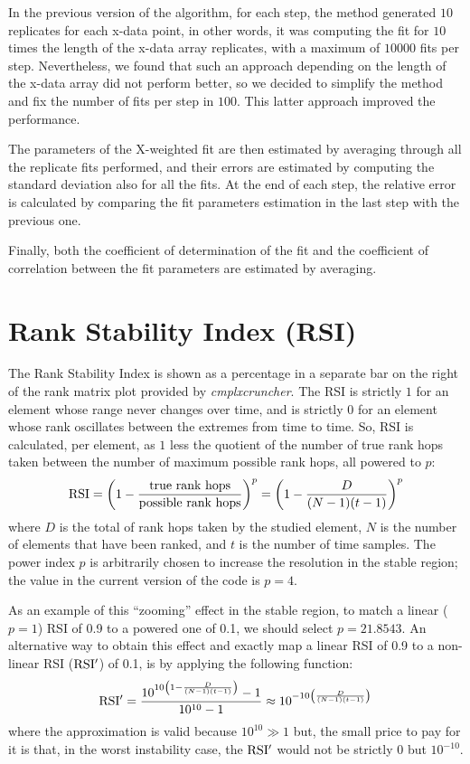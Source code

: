 \documentclass[12pt]{article}
\newcommand{\CC}[0]{\emph{cmplxcruncher}}
\begin{document}
In the previous version of the algorithm, for each step, the method generated $10$ replicates for each x-data point, in other words, it was computing the fit for $10$ times the length of the x-data array replicates, with a maximum of $10000$ fits per step. Nevertheless, we found that such an approach depending on the length of the x-data array did not perform better, so we decided to simplify the method and fix the number of fits per step in $100$. This latter approach improved the performance. 

The parameters of the X-weighted fit are then estimated by averaging through all the replicate fits performed, and their errors are estimated by computing the standard deviation also for all the fits. At the end of each step, the relative error is calculated by comparing the fit parameters estimation in the last step with the previous one.

Finally, both the coefficient of determination of the fit and the coefficient of correlation between the fit parameters are estimated by averaging.

\section{Rank Stability Index (RSI)}\label{sec:RSI}

The Rank Stability Index is shown as a percentage in a separate bar on the right of the rank matrix plot provided by \CC. The RSI is strictly $1$ for an element whose range never changes over time, and is strictly $0$ for an element whose rank oscillates between the extremes from time to time. So, RSI is calculated, per element, as $1$ less the quotient of the number of true rank hops taken between the number of maximum possible rank hops, all powered to $p$:
$${\rm RSI} = \left(1-\frac{\text{true rank hops}}{\text{possible rank hops}}\right)^p = \left(1-\frac{D}{(N-1)(t-1)}\right)^p$$
where $D$ is the total of rank hops taken by the studied element, $N$ is the number of elements that have been ranked, and $t$ is the number of time samples. The power index $p$ is arbitrarily chosen to increase the resolution in the stable region; the value in the current version of the code is $p=4$. 

As an example of this ``zooming'' effect in the stable region, to match a linear ($p=1$) RSI of 0.9 to a powered one of 0.1, we should select $p=21.8543$. An alternative way to obtain this effect and exactly map a linear RSI of 0.9 to a non-linear RSI (${\rm RSI'}$) of 0.1, is by applying the following function:
$${\rm RSI'} = \frac{10^{10\left(1-\frac{D}{(N-1)(t-1)}\right)}-1}{10^{10}-1} \approx 10^{-10\left(\frac{D}{(N-1)(t-1)}\right)} $$
where the approximation is valid because $10^{10}\gg 1$ but, the small price to pay for it is that, in the worst instability case, the ${\rm RSI'}$ would not be strictly $0$ but $10^{-10}$.
\end{document}
